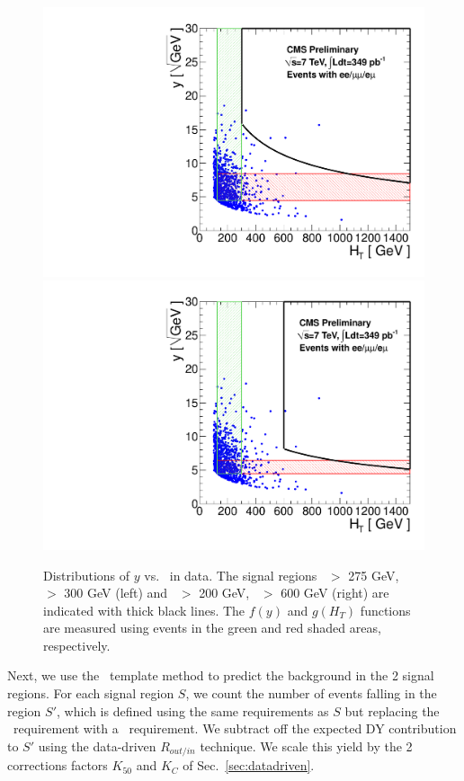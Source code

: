 \begin{figure}[hbt]
\begin{center}
\includegraphics[width=0.48\linewidth]{plots_final/abcdprime_349pb_highmet.pdf}
\includegraphics[width=0.48\linewidth]{plots_final/abcdprime_349pb_highht.pdf}
\caption{\label{fig:abcdprimedata}\protect 
Distributions of $y$ vs. \Ht\ in data. The signal regions \met\ $>$ 275 GeV, \Ht\ $>$ 300 GeV (left)
and \met\ $>$ 200 GeV, \Ht\ $>$ 600 GeV (right) are indicated with thick black lines. 
The $f(y)$ and $g(H_T)$ 
functions are measured using events in the green and red shaded areas, respectively.
}
\end{center}
\end{figure}

Next, we use the \ptll\ template method to predict the background in the 2 signal regions.
For each signal region $S$, we count the number of events falling in the region $S'$, which is 
defined using the same requirements as $S$ but replacing the \MET\ requirement with a \ptll\
requirement. We subtract off the expected DY contribution to $S'$ using the data-driven $R_{out/in}$
technique. We scale this yield by the 2 corrections factors $K_{50}$ and $K_C$ of Sec.~\ref{sec:datadriven}.



